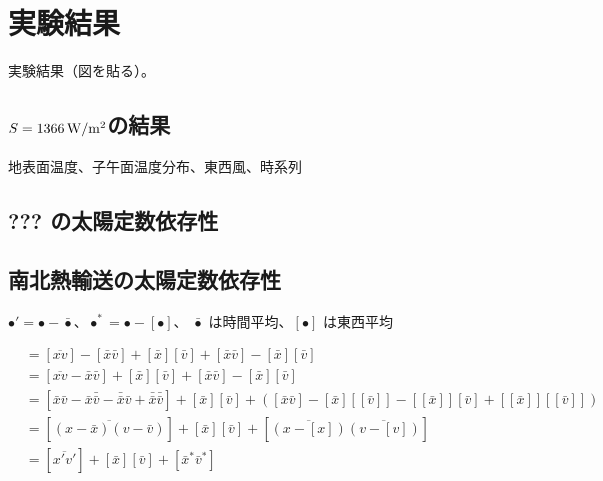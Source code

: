 \documentclass[body]{subfiles}
\begin{document}
\chapter{実験結果}

実験結果（図を貼る）。

\section{\(S=1366\hmu{W/m^2}\)の結果}
地表面温度、子午面温度分布、東西風、時系列

\section{??? の太陽定数依存性}

\section{南北熱輸送の太陽定数依存性}

\(\bullet'=\bullet-\bar\bullet\)、\(\bullet^*=\bullet-[\bullet]\)、
\(\bar\bullet\) は時間平均、\([\bullet]\) は東西平均

\begin{align}
	[\overline{xv}]&=[\overline{xv}]-[\bar x\bar v]+[\bar x][\bar v]+[\bar x\bar v]-[\bar x][\bar v]\\
	&=[\overline{xv}-\bar x\bar v]+[\bar x][\bar v]+[\bar x\bar v]-[\bar x][\bar v]\\
	&=[\bar x\bar v-\bar x\bar\bar v-\bar\bar x\bar v+\bar\bar x\bar\bar v]+[\bar x][\bar v]
		+([\bar x\bar v]-[\bar x][[\bar v]]-[[\bar x]][\bar v]+[[\bar x]][[\bar v]])\\
	&=[\overline{(x-\bar x)(v-\bar v)}]+[\bar x][\bar v]+[\overline{(x-[x])}\overline{(v-[v])}]\\
	&=[\overline{x'v'}]+[\bar x][\bar v]+[\bar x^*\bar v^*]
\end{align}
\end{document}

